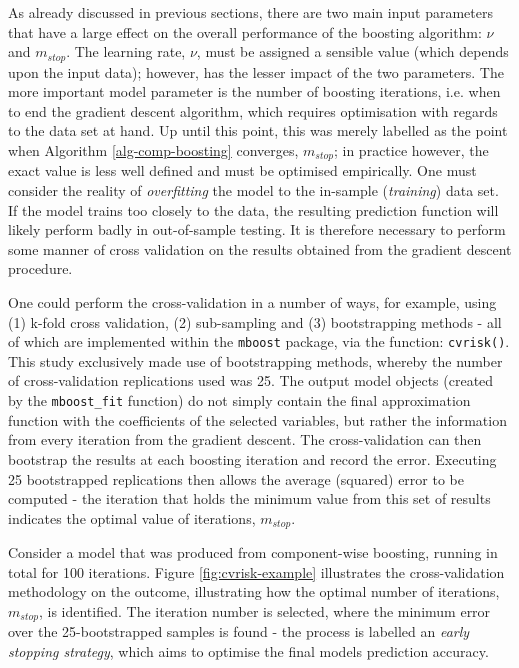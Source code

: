 \documentclass{article}
\begin{document}
As already discussed in previous sections, there are two main input parameters that have a large effect on the overall performance of the boosting algorithm: $\nu$ and $m_{stop}$. The learning rate, $\nu$, must be assigned a sensible value (which depends upon the input data); however, has the lesser impact of the two parameters. The more important model parameter is the number of boosting iterations, i.e. when to end the gradient descent algorithm, which requires optimisation with regards to the data set at hand. Up until this point, this was merely labelled as the point when Algorithm \eqref{alg-comp-boosting} converges, $m_{stop}$; in practice however, the exact value is less well defined and must be optimised empirically. One must consider the reality of \emph{overfitting} the model to the in-sample (\emph{training}) data set. If the model trains too closely to the data, the resulting prediction function will likely perform badly in out-of-sample testing. It is therefore necessary to perform some manner of cross validation on the results obtained from the gradient descent procedure.

One could perform the cross-validation in a number of ways, for example, using (1) k-fold cross validation, (2) sub-sampling and (3) bootstrapping methods - all of which are implemented within the \texttt{mboost} package, via the function: \texttt{cvrisk()}. This study exclusively made use of bootstrapping methods, whereby the number of cross-validation replications used was 25. The output model objects (created by the \texttt{mboost\_fit} function) do not simply contain the final approximation function with the coefficients of the selected variables, but rather the information from every iteration from the gradient descent. The cross-validation can then bootstrap the results at each boosting iteration and record the error. Executing 25 bootstrapped replications then allows the average (squared) error to be computed - the iteration that holds the minimum value from this set of results indicates the optimal value of iterations, $m_{stop}$. 

Consider a model that was produced from component-wise boosting, running in total for 100 iterations. Figure \ref{fig:cvrisk-example} illustrates the cross-validation methodology on the outcome, illustrating how the optimal number of iterations, $m_{stop}$, is identified. The iteration number is selected, where the minimum error over the 25-bootstrapped samples is found - the process is labelled an \emph{early stopping strategy}, which aims to optimise the final models prediction accuracy.
\end{document}

